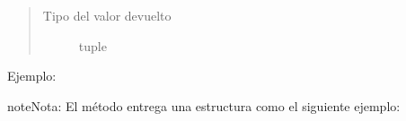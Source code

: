 \documentclass[a4paper,12pt,spanish]{sphinxmanual}
\begin{document}
\begin{fulllineitems}
\begin{fulllineitems}
\begin{quote}
\begin{description}
\begin{itemize}
\end{itemize}


\item[{Tipo del valor devuelto}] \leavevmode
tuple

\end{description}\end{quote}

Ejemplo:

\begin{sphinxVerbatim}[commandchars=\\\{\}]
   
  
  
 
\end{sphinxVerbatim}

\begin{sphinxadmonition}{note}{Nota:}
El método  entrega una estructura como el siguiente ejemplo:


\end{sphinxadmonition}
\end{fulllineitems}
\end{fulllineitems}
\end{document}
